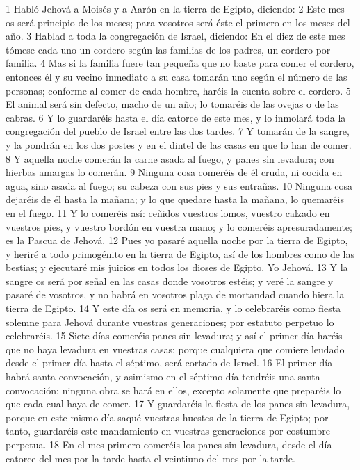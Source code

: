 1 Habló Jehová a Moisés y a Aarón en la tierra de Egipto, diciendo:
2 Este mes os será principio de los meses; para vosotros será éste el primero en los meses del año.
3 Hablad a toda la congregación de Israel, diciendo: En el diez de este mes tómese cada uno un cordero según las familias de los padres, un cordero por familia.
4 Mas si la familia fuere tan pequeña que no baste para comer el cordero, entonces él y su vecino inmediato a su casa tomarán uno según el número de las personas; conforme al comer de cada hombre, haréis la cuenta sobre el cordero.
5 El animal será sin defecto, macho de un año; lo tomaréis de las ovejas o de las cabras.
6 Y lo guardaréis hasta el día catorce de este mes, y lo inmolará toda la congregación del pueblo de Israel entre las dos tardes.
7 Y tomarán de la sangre, y la pondrán en los dos postes y en el dintel de las casas en que lo han de comer.
8 Y aquella noche comerán la carne asada al fuego, y panes sin levadura; con hierbas amargas lo comerán.
9 Ninguna cosa comeréis de él cruda, ni cocida en agua, sino asada al fuego; su cabeza con sus pies y sus entrañas.
10 Ninguna cosa dejaréis de él hasta la mañana; y lo que quedare hasta la mañana, lo quemaréis en el fuego.
11 Y lo comeréis así: ceñidos vuestros lomos, vuestro calzado en vuestros pies, y vuestro bordón en vuestra mano; y lo comeréis apresuradamente; es la Pascua de Jehová.
12 Pues yo pasaré aquella noche por la tierra de Egipto, y heriré a todo primogénito en la tierra de Egipto, así de los hombres como de las bestias; y ejecutaré mis juicios en todos los dioses de Egipto. Yo Jehová.
13 Y la sangre os será por señal en las casas donde vosotros estéis; y veré la sangre y pasaré de vosotros, y no habrá en vosotros plaga de mortandad cuando hiera la tierra de Egipto.
14 Y este día os será en memoria, y lo celebraréis como fiesta solemne para Jehová durante vuestras generaciones; por estatuto perpetuo lo celebraréis.
15 Siete días comeréis panes sin levadura; y así el primer día haréis que no haya levadura en vuestras casas; porque cualquiera que comiere leudado desde el primer día hasta el séptimo, será cortado de Israel.
16 El primer día habrá santa convocación, y asimismo en el séptimo día tendréis una santa convocación; ninguna obra se hará en ellos, excepto solamente que preparéis lo que cada cual haya de comer.
17 Y guardaréis la fiesta de los panes sin levadura, porque en este mismo día saqué vuestras huestes de la tierra de Egipto; por tanto, guardaréis este mandamiento en vuestras generaciones por costumbre perpetua.
18 En el mes primero comeréis los panes sin levadura, desde el día catorce del mes por la tarde hasta el veintiuno del mes por la tarde.
